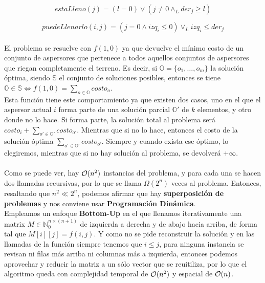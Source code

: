\documentclass[./main.tex]{subfiles}
\begin{document}
\begin{equation}
 estaLleno(j) = (l = 0) \lor (j \neq 0 \land_L der_j \geq l)
\end{equation}

\begin{equation}
 puedeLlenarlo(i, j) = (j = 0 \land izq_i \leq 0) \lor_L izq_i \leq der_j
\end{equation}

\paragraph{} El problema se resuelve con \(f(1, 0)\) ya que devuelve el mínimo costo de un conjunto de aspersores que pertenece a todos aquellos conjuntos de aspersores que riegan completamente el terreno. Es decir, si \(\mathbb{O} = \{o_1, \ldots, o_m\}\) la solución óptima, siendo \(\mathbb{S}\) el conjunto de soluciones posibles, entonces se tiene \(\mathbb{O} \in \mathbb{S} \iff f(1, 0) = \sum_{o \in \mathbb{O}}costo_o\). \\
Esta función tiene este comportamiento ya que existen dos casos, uno en el que el aspersor actual \(i\) forma parte de una solución parcial \(\mathbb{O}'\) de \(k\) elementos, y otro donde no lo hace. Si forma parte, la solución total al problema será \(costo_i + \sum_{o' \in \mathbb{O}'}costo_{o'}\). Mientras que si no lo hace, entonces el costo de la solución óptima \(\sum_{o' \in \mathbb{O}'}costo_{o'}\). Siempre y cuando exista ese óptimo, lo elegiremos, mientras que si no hay solución al problema, se devolverá \(+\infty\).

\paragraph{} Como se puede ver, hay \(\mathcal{O}(n^2)\) instancias del problema, y para cada una se hacen dos llamadas recursivas, por lo que se llama \(\Omega(2^n)\) veces al problema. Entonces, resaltando que \(n^2 \ll 2^n\), podemos afirmar que hay \textbf{superposición de problemas} y nos conviene usar \textbf{Programación Dinámica}. \\
Empleamos un enfoque \textbf{Bottom-Up} en el que llenamos iterativamente una matrix \(M \in \mathbb{N}_0^{n \times (n+1)}\) de izquierda a derecha y de abajo hacia arriba, de forma tal que \(M[i][j] = f(i, j)\). Y como no se pide reconstruir la solución y en las llamadas de la función siempre tenemos que \(i \leq j\), para ninguna instancia se revisan ni filas más arriba ni columnas más a izquierda, entonces podemos aprovechar y reducir la matriz a un sólo vector que se reuitiliza, por lo que el algoritmo queda con complejidad temporal de \(\mathcal{O}(n^2)\) y espacial de \(\mathcal{O}(n)\).
\end{document}
